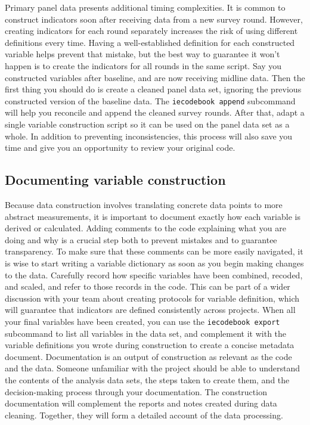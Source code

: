 Primary panel data presents additional timing complexities.
It is common to construct indicators soon after receiving data from a new survey round.
However, creating indicators for each round separately increases the risk of using different definitions every time.
Having a well-established definition for each constructed variable helps prevent that mistake,
but the best way to guarantee it won't happen is to create the indicators for all rounds in the same script.
Say you constructed variables after baseline, and are now receiving midline data.
Then the first thing you should do is create a cleaned panel data set,
ignoring the previous constructed version of the baseline data.
The \texttt{iecodebook append} subcommand will help you reconcile and append the cleaned survey rounds.
After that, adapt a single variable construction script so it can be used on the panel data set as a whole.
In addition to preventing inconsistencies,
this process will also save you time and give you an opportunity to review your original code.


\subsection{Documenting variable construction}

Because data construction involves translating concrete data points to more abstract measurements,
it is important to document exactly how each variable is derived or calculated.
Adding comments to the code explaining what you are doing and why is a crucial step both to prevent mistakes and to guarantee transparency.
To make sure that these comments can be more easily navigated,
it is wise to start writing a variable dictionary as soon as you begin making changes to the data.
Carefully record how specific variables have been combined, recoded, and scaled,
and refer to those records in the code.
This can be part of a wider discussion with your team about creating protocols for variable definition,
which will guarantee that indicators are defined consistently across projects.
When all your final variables have been created,
you can use the \texttt{iecodebook export} subcommand to list all variables in the data set,
and complement it with the variable definitions you wrote during construction to create a concise metadata document.
Documentation is an output of construction as relevant as the code and the data.
Someone unfamiliar with the project should be able to understand the contents of the analysis data sets,
the steps taken to create them,
and the decision-making process through your documentation.
The construction documentation will complement the reports and notes created during data cleaning.
Together, they will form a detailed account of the data processing.

